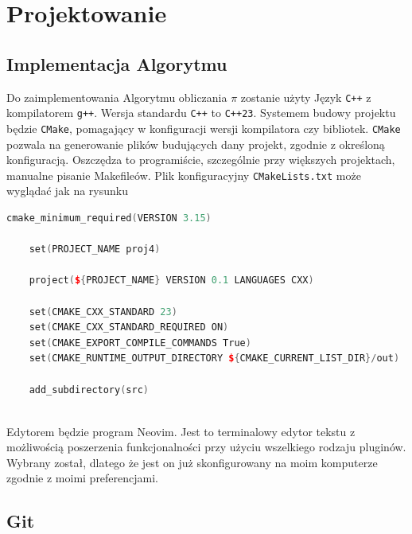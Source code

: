 	\newpage
\section{Projektowanie}		%

\subsection{Implementacja Algorytmu}

Do zaimplementowania Algorytmu obliczania $\pi$ zostanie użyty Język \texttt{C++} z kompilatorem \texttt{g++}. Wersja standardu \texttt{C++} to \texttt{C++23}. Systemem budowy projektu będzie \texttt{CMake}, pomagający w konfiguracji wersji kompilatora czy bibliotek. \texttt{CMake} pozwala na generowanie plików budujących dany projekt, zgodnie z określoną konfiguracją. Oszczędza to programiście, szczególnie przy większych projektach, manualne pisanie Makefileów.
Plik konfiguracyjny \texttt{CMakeLists.txt} może wyglądać jak na rysunku

\begin{lstlisting}[caption=Plik konfiguracyjny CMake, label={lst:cmakelists}, language=C++]
	cmake_minimum_required(VERSION 3.15)
	
	set(PROJECT_NAME proj4)
	
	project(${PROJECT_NAME} VERSION 0.1 LANGUAGES CXX)
	
	set(CMAKE_CXX_STANDARD 23)
	set(CMAKE_CXX_STANDARD_REQUIRED ON)
	set(CMAKE_EXPORT_COMPILE_COMMANDS True)
	set(CMAKE_RUNTIME_OUTPUT_DIRECTORY ${CMAKE_CURRENT_LIST_DIR}/out)
	
	add_subdirectory(src)
	
\end{lstlisting}

Edytorem będzie program Neovim. Jest to terminalowy edytor tekstu z możliwością poszerzenia funkcjonalności przy użyciu wszelkiego rodzaju pluginów. Wybrany został, dlatego że jest on już skonfigurowany na moim komputerze zgodnie z moimi preferencjami.

\subsection{Git}


